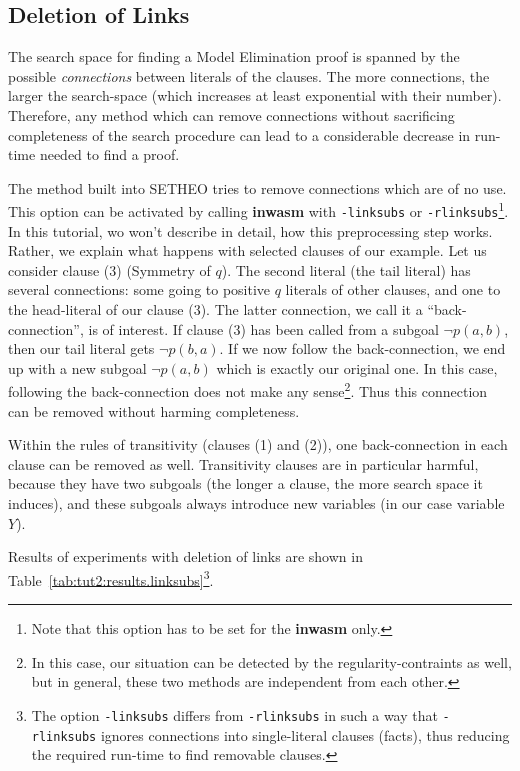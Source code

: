 \subsection{Deletion of Links}

The search space for finding a Model Elimination proof is spanned
by the possible {\em connections\/} between literals of the clauses. The more
connections, the larger the search-space (which increases at least
exponential with their number). Therefore, any method which can
remove connections without sacrificing completeness of the search procedure
can lead to a considerable decrease in run-time needed to find a proof.

The method built into SETHEO tries to remove connections which
are of no use. This option can be activated by calling {\bf inwasm}
with {\tt -linksubs} or {\tt -rlinksubs}\footnote{
	Note that this option has to be set for the {\bf inwasm} only.}.
In this tutorial, wo won't describe in detail, how this preprocessing
step works. Rather, we explain what happens 
with selected clauses of our example.
Let us consider clause (3) (Symmetry of $q$). The second literal
(the tail literal) has several connections: some going to positive
$q$ literals of other clauses, and one to the head-literal
of our clause (3). The latter connection, we call it a 
``back-connection'',
is of interest. If clause (3) has been called from a subgoal
$\neg p(a,b)$, then our tail literal gets $\neg p(b,a)$. If we now follow
the back-connection, we end up with a new subgoal $\neg p(a,b)$ which
is exactly our original one. In this case, following the back-connection
does not make any sense\footnote{
	In this case, our situation can be detected by the
	regularity-contraints as well, but in general, these
	two methods are independent from each other.
	}.
Thus this connection can be removed without
harming completeness.

Within the rules of transitivity (clauses (1) and (2)), one
back-connection in each clause can be removed as well. 
Transitivity clauses are in particular harmful, because they have two
subgoals (the longer a clause, the more search space it induces), and
these subgoals always introduce new variables (in our case variable $Y$).

Results of experiments with deletion of links are shown in
Table~\ref{tab:tut2:results.linksubs}\footnote{
	The option {\tt -linksubs} differs from 
	{\tt -rlinksubs} in such a way that
	{\tt -rlinksubs} ignores connections into single-literal clauses 
	(facts), thus reducing the required run-time to find 
	removable clauses.}.

